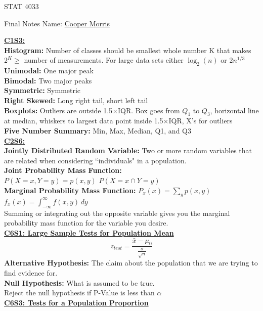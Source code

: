 \documentclass[letter, 12pt]{article}
\begin{document}
\begin{center}
STAT 4033
\end{center}
Final Notes \hfill Name: \uline{Cooper Morris}
\begin{multicols}{2}
\textbf{\uline{C1S3:}}\\
\textbf{Histogram:} Number of classes should be smallest whole number K that makes $2^K \geq$ number of measurements. For large data sets either $\log_2(n)$ or $2n^{1/3}$\\
\textbf{Unimodal:} One major peak\\
\textbf{Bimodal:} Two major peaks\\
\textbf{Symmetric:} Symmetric\\
\textbf{Right Skewed:} Long right tail, short left tail\\
\textbf{Boxplots:} Outliers are outside 1.5$\times$IQR. Box goes from $Q_1$ to $Q_3$, horizontal line at median, whiskers to largest data point inside 1.5$\times$IQR, X's for outliers\\
\textbf{Five Number Summary:} Min, Max, Median, Q1, and Q3\\
\textbf{\uline{C2S6:}}\\
\textbf{Jointly Distributed Random Variable:} Two or more random variables that are related when considering ``individuals" in a population.\\
\textbf{Joint Probability Mass Function:} \\
\(P(X=x, Y=y) = p(x,y)\) \(P(X=x \cap Y=y)\) \\
\textbf{Marginal Probability Mass Function:} \(P_x(x) = \sum_y p(x,y)\)\\
\(f_x(x) = \int_{-\infty}^\infty f(x,y)\,dy\)\\
Summing or integrating out the opposite variable gives you the marginal probability mass function for the variable you desire.\\
\textbf{\uline{C6S1: Large Sample Tests for Population Mean}}\\
\[z_{test} = \frac{\bar{x}-\mu_0}{\frac{\sigma}{\sqrt{n}}}\]
\textbf{Alternative Hypothesis:} The claim about the population that we are trying to find evidence for.\\
\textbf{Null Hypothesis:} What is assumed to be true.\\
Reject the null hypothesis if P-Value is less than \(\alpha\)\\
\vfill
\columnbreak
\vspace*{\fill}
\textbf{\uline{C6S3: Tests for a Population Proportion}}\\

\end{multicols}
\end{document}
